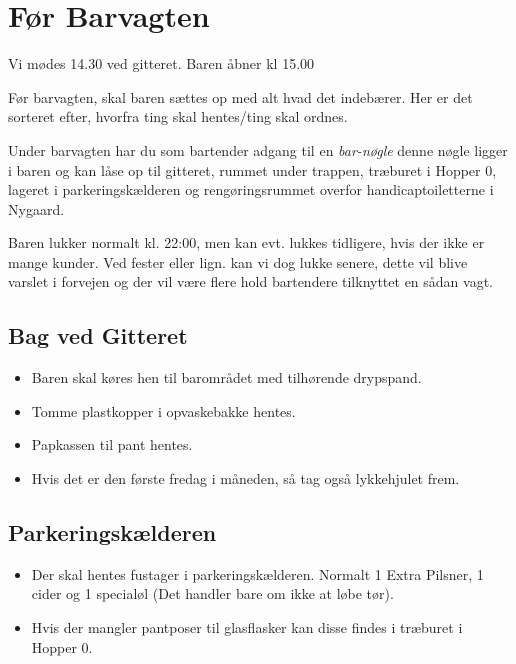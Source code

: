 \section{Før Barvagten}
\label{sec:pre-barvagten}

Vi mødes 14.30 ved gitteret. Baren åbner kl 15.00

Før barvagten, skal baren sættes op med alt hvad det indebærer. Her er
det sorteret efter, hvorfra ting skal hentes/ting skal ordnes.

Under barvagten har du som bartender adgang til en \textit{bar-nøgle} 
denne nøgle ligger i baren og kan låse op til gitteret, rummet under trappen, træburet i Hopper 0, 
lageret i parkeringskælderen og rengøringsrummet overfor handicaptoiletterne i Nygaard.

Baren lukker normalt kl. 22:00, men kan evt. lukkes tidligere, hvis der ikke er mange kunder.
Ved fester eller lign. kan vi dog lukke senere, dette vil blive varslet i forvejen og der vil 
være flere hold bartendere tilknyttet en sådan vagt.

\subsection{Bag ved Gitteret}
\label{sec:pre:bag-ved-gitteret}

\begin{itemize}
\item Baren skal køres hen til barområdet med tilhørende drypspand.
\item Tomme plastkopper i opvaskebakke hentes.
\item Papkassen til pant hentes.
\item Hvis det er den første fredag i måneden, så tag også lykkehjulet frem.
\end{itemize}

\subsection{Parkeringskælderen}
\label{sec:pre:hopper}

\begin{itemize}
\item Der skal hentes fustager i parkeringskælderen. Normalt 1
  Extra Pilsner, 1 cider og 1 specialøl (Det handler bare om ikke at løbe
  tør).
\item Hvis der mangler pantposer til glasflasker kan disse findes i træburet i Hopper 0.
\end{itemize}

